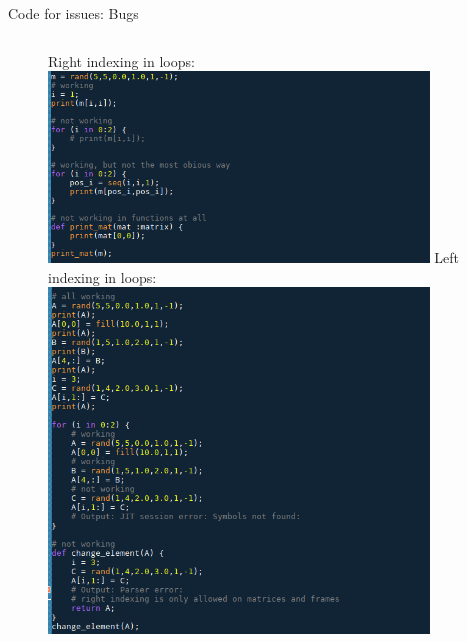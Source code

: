 \documentclass[aspectratio=169]{beamer}
\begin{document}
\begin{frame}[c]{Code for issues: Bugs}
    \begin{figure}
        \begin{columns}[onlytextwidth,t]
            Right indexing in loops: \\
            \includegraphics[width=0.9\textwidth]{images/I5.png}
            Left indexing in loops: \\
            \includegraphics[width=0.9\textwidth]{images/I6.png}
        \end{columns}        
    \end{figure}          
\end{frame}
\end{document}
